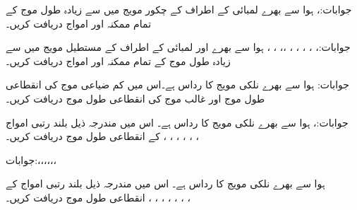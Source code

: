 جوابات:،  
ہوا سے بھرے  لمبائی کے اطراف کے چکور مویج میں  سے زیادہ طول موج کے تمام ممکنہ  اور  امواج دریافت کریں۔

جوابات:، ، ، ، ، ،، ، ،
ہوا سے بھرے  اور  لمبائی کے اطراف کے  مستطیل مویج میں  سے زیادہ طول موج کے تمام ممکنہ  اور  امواج دریافت کریں۔

جوابات:
ہوا سے بھرے نلکی مویج کا رداس  ہے۔اس میں کم ضیاعی  موج کی انقطاعی طول موج اور غالب  موج کی انقطاعی طول موج دریافت کریں۔

جوابات:، 
ہوا سے بھرے نلکی مویج کا رداس  ہے۔ اس میں مندرجہ ذیل بلند رتبی امواج کے انقطاعی طول موج دریافت کریں۔ ، ، ، ، ،  ، 

جوابات:،،،،،،

ہوا سے بھرے نلکی مویج کا رداس  ہے۔ اس میں مندرجہ ذیل بلند رتبی امواج کے انقطاعی طول موج دریافت کریں۔ ، ، ، ، ، ، ، 

